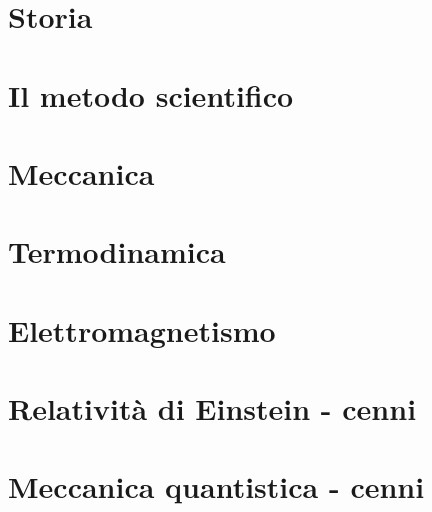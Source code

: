 
\part{Storia}


\part{Il metodo scientifico}


\part{Meccanica}


\part{Termodinamica}


\part{Elettromagnetismo}


\part{Relatività di Einstein - cenni}


\part{Meccanica quantistica - cenni}

